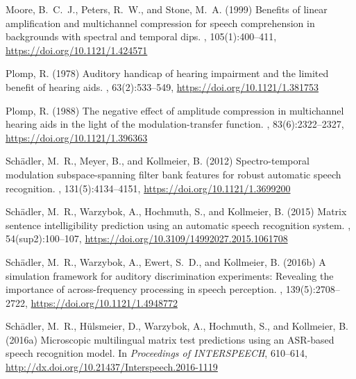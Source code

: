 \documentclass[10pt,a4paper,twocolumn]{article}
\begin{document}
\begin{thebibliography}{}
	Moore, B.~C.~J., Peters, R.~W., and Stone, M.~A. (1999)
	\newblock Benefits of linear amplification and multichannel compression for speech comprehension in backgrounds with spectral and temporal dips.
	, 105(1):400--411, \url{https://doi.org/10.1121/1.424571}
	
	Plomp, R. (1978)
	\newblock Auditory handicap of hearing impairment and the limited benefit of hearing aids.
	, 63(2):533--549, \url{https://doi.org/10.1121/1.381753}

	Plomp, R. (1988)
	\newblock The negative effect of amplitude compression in multichannel hearing aids in the light of the modulation-transfer function.
	, 83(6):2322--2327, \url{https://doi.org/10.1121/1.396363}

	Schädler, M.~R., Meyer, B., and Kollmeier, B. (2012)
	\newblock Spectro-temporal modulation subspace-spanning filter bank features for robust automatic speech recognition.
	, 131(5):4134--4151, \url{https://doi.org/10.1121/1.3699200}
	
	Schädler, M.~R., Warzybok, A., Hochmuth, S., and Kollmeier, B. (2015)
	\newblock Matrix sentence intelligibility prediction using an automatic speech recognition system.
	, 54(sup2):100--107, \url{https://doi.org/10.3109/14992027.2015.1061708}
	
	Schädler, M.~R., Warzybok, A., Ewert, S.~D., and Kollmeier, B. (2016b)
	\newblock A simulation framework for auditory discrimination experiments: Revealing the importance of across-frequency processing in speech perception.
	, 139(5):2708--2722, \url{https://doi.org/10.1121/1.4948772}
	
	Schädler, M.~R., Hülsmeier, D., Warzybok, A., Hochmuth, S., and Kollmeier, B. (2016a)
	\newblock Microscopic multilingual matrix test predictions using an ASR-based speech recognition model.
	\newblock In {\em Proceedings of INTERSPEECH}, 610--614, \url{http://dx.doi.org/10.21437/Interspeech.2016-1119}
	

\end{thebibliography}
\end{document}
